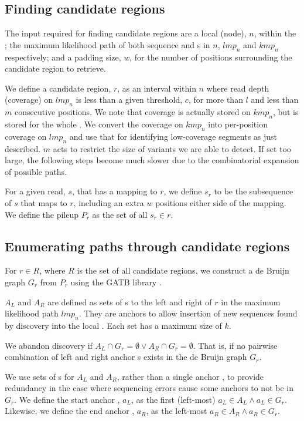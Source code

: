 \subsection{Finding candidate regions}
\label{sec:denovo-candidate-regions}

The input required for finding candidate regions are a local \prg{} (node), $n$, within the \pandora{} \panrg{}; the maximum likelihood path of both sequence and \kmer{}s in $n$, $lmp_n$ and $kmp_n$ respectively; and a padding size, $w$, for the number of positions surrounding the candidate region to retrieve.

We define a candidate region, $r$, as an interval within $n$ where read depth (coverage) on $lmp_n$ is less than a given threshold, $c$, for more than $l$ and less than $m$ consecutive positions. We note that coverage is actually stored on $kmp_n$, but is stored for the whole \kmer{}. We convert the coverage on $kmp_n$ into per-position coverage on $lmp_n$ and use that for identifying low-coverage segments as just described. $m$ acts to restrict the size of variants we are able to detect. If set too large, the following steps become much slower due to the combinatorial expansion of possible paths. 

For a given read, $s$, that has a mapping to $r$, we define $s_r$ to be the subsequence of $s$ that maps to $r$, including an extra $w$ positions either side of the mapping. We define the pileup $P_r$ as the set of all $s_r \in r$.

\subsection{Enumerating paths through candidate regions}
\label{sec:path-enum}

For $r \in R$, where $R$ is the set of all candidate regions, we construct a de Bruijn graph $G_r$ from $P_r$ using the GATB library \cite{gatb2014}. 

$A_L$ and $A_R$ are defined as sets of \kmer{}s to the left and right of $r$ in the maximum likelihood path $lmp_n$. They are anchors to allow insertion of new sequences found by \denovo{} discovery into the local \prg{}. Each set has a maximum size of $k$.

We abandon \denovo{} discovery if $A_L \cap G_r = \emptyset \lor A_R \cap G_r = \emptyset$. That is, if no pairwise combination of left and right anchor \kmer{}s exists in the de Bruijn graph $G_r$.

We use sets of \kmer{}s for $A_L$ and $A_R$, rather than a single anchor \kmer{}, to provide redundancy in the case where sequencing errors cause some anchors to not be in $G_r$. We define the start anchor \kmer{}, $a_L$, as the first (left-most) $a_L \in A_L \land a_L \in G_r$. Likewise, we define the end anchor \kmer{}, $a_R$, as the left-most $a_R \in A_R \land a_R \in G_r$.

